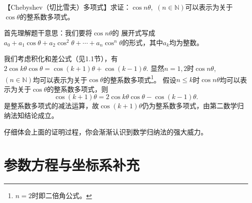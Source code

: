 \begin{example}
    【\textup{Chebyshev}（切比雪夫）多项式】求证：$\cos n\theta$,~$(n \in \mathbb{N})$可以表示为关于$\cos \theta$的整系数多项式。
\end{example}
\begin{prove}
    首先理解题干意思：我们要将$\cos n\theta$的
    展开式写成$a_0+a_1\cos \theta+a_2\cos^2 \theta+\cdots +a_n \cos^n\theta$的形式，其中$a_k$均为整数。


    我们考虑积化和差公式（见1.1节），有$2\cos k\theta\cos \theta=\cos (k+1)\theta +\cos (k-1)\theta$.
    显然$n=1,2$时$\cos n\theta$,~$(n \in \mathbb{N})$均可以表示为关于$\cos \theta$的整系数多项式\footnote{$n=2$时即二倍角公式。}。
    假设$n\leqslant k$时$\cos n\theta$均可以表示为关于$\cos \theta$的整系数多项式，则
    \[
        \cos (k+1)\theta=2\cos k\theta\cos \theta-\cos (k-1)\theta
        .\]
    是整系数多项式的减法运算，故$\cos (k+1)\theta$仍为整系数多项式，由第二数学归纳法知结论成立。
\end{prove}
仔细体会上面的证明过程，你会渐渐认识到数学归纳法的强大威力。

\section{参数方程与坐标系补充}

